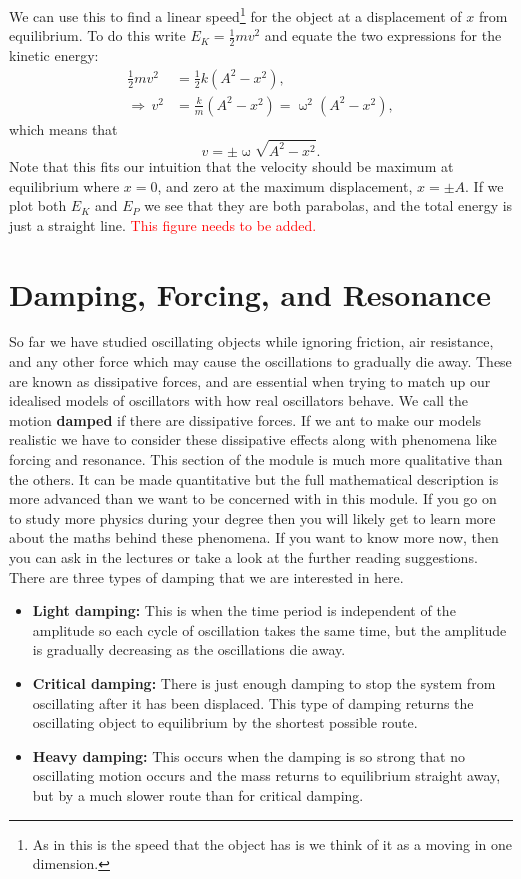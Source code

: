 \documentclass[a4paper,12pt]{book}
\begin{document}
We can use this to find a linear speed\footnote{As in this is the speed that the object has is we think of it as a moving in one dimension.} for the object at a displacement of $x$ from equilibrium. To do this write $E_{K}=\frac{1}{2}mv^{2}$ and equate the two expressions for the kinetic energy:
\begin{align*}
\frac{1}{2}mv^{2}&=\frac{1}{2}k\left(A^{2}-x^{2}\right),\\
\Rightarrow \, v^{2}&=\frac{k}{m}\left(A^{2}-x^{2}\right)=\upomega^{2}\left(A^{2}-x^{2}\right),
\end{align*}
which means that
\begin{equation*}
v=\pm\upomega\sqrt{A^{2}-x^{2}}.
\end{equation*}
Note that this fits our intuition that the velocity should be maximum at equilibrium where $x=0$, and zero at the maximum displacement, $x=\pm A$. If we plot both $E_{K}$ and $E_{P}$ we see that they are both parabolas, and the total energy is just a straight line. \textcolor{red}{This figure needs to be added.}

\section{Damping, Forcing, and Resonance}
So far we have studied oscillating objects while ignoring friction, air resistance, and any other force which may cause the oscillations to gradually die away. These are known as dissipative forces, and are essential when trying to match up our idealised models of oscillators with how real oscillators behave. We call the motion \textbf{damped} if there are dissipative forces. If we ant to make our models realistic we have to consider these dissipative effects along with phenomena like forcing and resonance. This section of the module is much more qualitative than the others. It can be made quantitative but the full mathematical description is more advanced than we want to be concerned with in this module. If you go on to study more physics during your degree then you will likely get to learn more about the maths behind these phenomena. If you want to know more now, then you can ask in the lectures or take a look at the further reading suggestions. \\

There are three types of damping that we are interested in here.
\begin{itemize}
\setlength{\itemsep}{-5pt}
    \item \textbf{Light damping:} This is when the time period is independent of the amplitude so each cycle of oscillation takes the same time, but the amplitude is gradually decreasing as the oscillations die away. 
    \item \textbf{Critical damping:} There is just enough damping to stop the system from oscillating after it has been displaced. This type of damping returns the oscillating object to equilibrium by the shortest possible route.
    \item \textbf{Heavy damping:} This occurs when the damping is so strong that no oscillating motion occurs and the mass returns to equilibrium straight away, but by a much slower route than for critical damping.
\end{itemize}  
\end{document}
